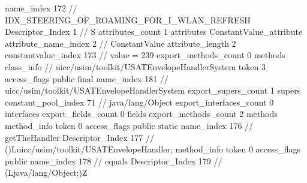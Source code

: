 {{{{{				name_index	172		// IDX_STEERING_OF_ROAMING_FOR_I_WLAN_REFRESH
				Descriptor_Index	1		// S
				attributes_count	1
				attributes {
				ConstantValue_attribute {
					attribute_name_index	2		// ConstantValue
					attribute_length	2
					constantvalue_index	173		// value = 239
				}
				}
			}
			}
			export_methods_count	0
			methods {
			}
		}
		class_info {		// uicc/usim/toolkit/USATEnvelopeHandlerSystem
			token	3
			access_flags	public final
			name_index	181		// uicc/usim/toolkit/USATEnvelopeHandlerSystem
			export_supers_count	1
			supers {
				constant_pool_index	71		// java/lang/Object
			}
			export_interfaces_count	0
			interfaces {
			}
			export_fields_count	0
			fields {
			}
			export_methods_count	2
			methods {
				method_info {
					token	0
					access_flags	public static
					name_index	176		// getTheHandler
					Descriptor_Index	177		// ()Luicc/usim/toolkit/USATEnvelopeHandler;
				}
				method_info {
					token	0
					access_flags	public
					name_index	178		// equals
					Descriptor_Index	179		// (Ljava/lang/Object;)Z
				}
			}
		}
	}
}
